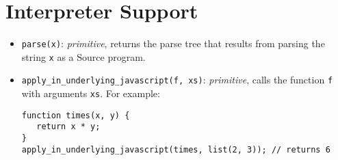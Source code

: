 \section*{Interpreter Support}

\begin{itemize}
\item \lstinline{parse(x)}: \textit{primitive}, returns the parse tree that results from parsing
the string \lstinline{x} as a Source program.
\item \lstinline{apply_in_underlying_javascript(f, xs)}: \textit{primitive}, calls the function \lstinline{f}
with arguments \lstinline{xs}. For example:
\begin{lstlisting}
function times(x, y) {
   return x * y;
}
apply_in_underlying_javascript(times, list(2, 3)); // returns 6
\end{lstlisting}
\end{itemize}
